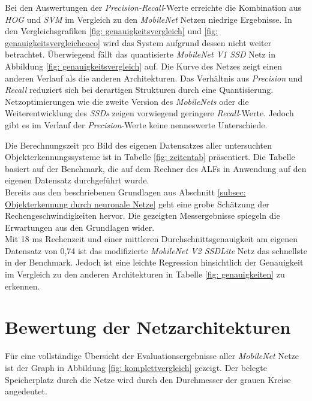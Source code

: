 Bei den Auswertungen der \textit{Precision-Recall}-Werte erreichte die Kombination aus \textit{HOG} und \textit{SVM} im Vergleich zu den \textit{MobileNet} Netzen niedrige Ergebnisse. In den Vergleichsgrafiken \ref{fig: genauigkeitsvergleich} und \ref{fig: genauigkeitsvergleichcoco} wird das System aufgrund dessen nicht weiter betrachtet. Überwiegend fällt das quantisierte \textit{MobileNet V1 SSD} Netz in Abbildung \ref{fig: genauigkeitsvergleich} auf. Die Kurve des Netzes zeigt einen anderen Verlauf als die anderen Architekturen. Das Verhältnis aus \textit{Precision} und \textit{Recall} reduziert sich bei derartigen Strukturen durch eine Quantisierung. Netzoptimierungen wie die zweite Version des \textit{MobileNets} oder die Weiterentwicklung des \textit{SSDs} zeigen vorwiegend geringere \textit{Recall}-Werte. Jedoch gibt es im Verlauf der \textit{Precision}-Werte keine nenneswerte Unterschiede. 



Die Berechnungszeit pro Bild des eigenen Datensatzes aller untersuchten Objekterkennungssysteme ist in Tabelle \ref{fig: zeitentab} präsentiert. Die Tabelle basiert auf der Benchmark, die auf dem Rechner des ALFs in Anwendung auf den eigenen Datensatz durchgeführt wurde.\\

Bereits aus den beschriebenen Grundlagen aus Abschnitt \ref{subsec: Objekterkennung durch neuronale Netze} geht eine grobe Schätzung der Rechengeschwindigkeiten hervor. Die gezeigten Messergebnisse spiegeln die Erwartungen aus den Grundlagen wider.\\





Mit 18 ms Rechenzeit und einer mittleren Durchschnittsgenauigkeit am eigenen Datensatz von 0,74 ist das modifizierte \textit{MobileNet V2 SSDLite} Netz das schnellste in der Benchmark. Jedoch ist eine leichte Regression hinsichtlich der Genauigkeit im Vergleich zu den anderen Architekturen in Tabelle \ref{fig: genauigkeiten} zu erkennen.  




\section{Bewertung der Netzarchitekturen}

Für eine vollständige Übersicht der Evaluationsergebnisse aller \textit{MobileNet} Netze ist der Graph in Abbildung \ref{fig: komplettvergleich} gezeigt. Der belegte Speicherplatz durch die Netze wird durch den Durchmesser der grauen Kreise angedeutet.\\

